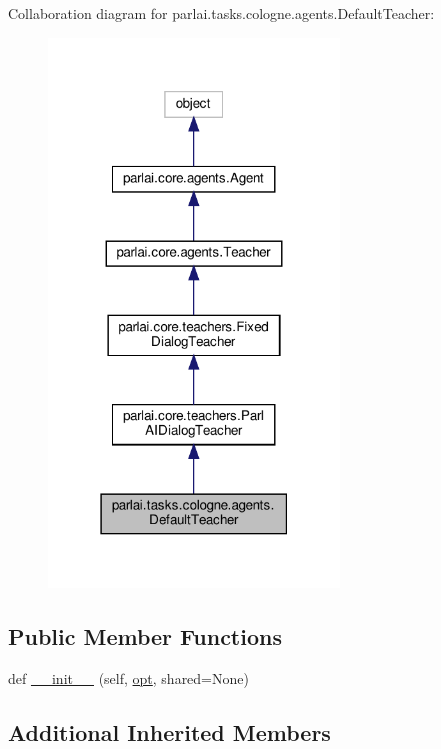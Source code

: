 Collaboration diagram for parlai.\+tasks.\+cologne.\+agents.\+Default\+Teacher\+:
\nopagebreak
\begin{figure}[H]
\begin{center}
\leavevmode
\includegraphics[width=219pt]{classparlai_1_1tasks_1_1cologne_1_1agents_1_1DefaultTeacher__coll__graph}
\end{center}
\end{figure}
\subsection*{Public Member Functions}
\begin{DoxyCompactItemize}
\item 
def \hyperlink{classparlai_1_1tasks_1_1cologne_1_1agents_1_1DefaultTeacher_ad318d4fbe6bd62f2bafb48324d4c4efe}{\+\_\+\+\_\+init\+\_\+\+\_\+} (self, \hyperlink{classparlai_1_1core_1_1agents_1_1Teacher_a3ce6243860ce978a897922863ed32fa4}{opt}, shared=None)
\end{DoxyCompactItemize}
\subsection*{Additional Inherited Members}


